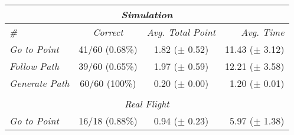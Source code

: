 \begin{table}
  \centering
  \begin{tabular}{lccr}
    \multicolumn{4}{c}{\textit{Simulation}}                         \\ \hline
    \textit{\#} & \textit{Correct} & \textit{Avg. Total Point} & \textit{Avg. Time} \\ \bottomrule
    \textit{Go to Point} & 41/60 (0.68\%) & 1.82 ($\pm$ 0.52) & 11.43 ($\pm$ 3.12) \\ \bottomrule
    \textit{Follow Path} & 39/60 (0.65\%) & 1.97 ($\pm$ 0.59) & 12.21 ($\pm$ 3.58) \\ \bottomrule
    \textit{Generate Path} & 60/60 (100\%) & 0.20 ($\pm$ 0.00) & 1.20 ($\pm$ 0.01) \\ \bottomrule
    \hline
    \multicolumn{4}{c}{\textit{ }}                                  \\
    \multicolumn{4}{c}{\textit{Real Flight}}                        \\ \hline
    \textit{Go to Point} & 16/18 (0.88\%) & 0.94 ($\pm$ 0.23) & 5.97 ($\pm$ 1.38) \\ \bottomrule
  \end{tabular}
\end{table}
